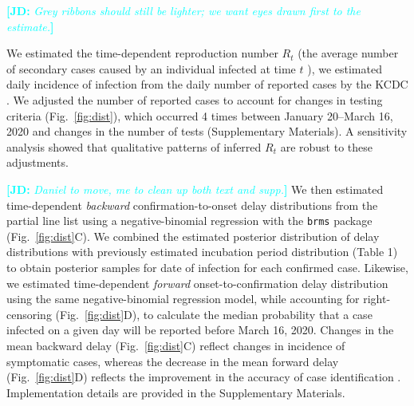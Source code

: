 \documentclass[12pt]{article}
\newcommand{\comment}{\showcomment}
\newcommand{\showcomment}[3]{\textcolor{#1}{\textbf{[#2: }\textsl{#3}\textbf{]}}}
\newcommand{\jd}[1]{\comment{cyan}{JD}{#1}}
\newcommand{\fref}[1]{Fig.~\ref{fig:#1}}
\begin{document}
\jd{Grey ribbons should still be lighter; we want eyes drawn first to the estimate.}

We estimated the time-dependent reproduction number $R_t$ (the average number of secondary cases caused by an individual infected at time $t$ \citep{fraser2007estimating}), we estimated daily incidence of infection  from the daily number of reported cases by the KCDC \citep{kcdc}.
We adjusted the number of reported cases to account for changes in testing criteria (\fref{dist}), which occurred 4 times between January 20--March 16, 2020 and changes in the number of tests (Supplementary Materials).
A sensitivity analysis showed that qualitative patterns of inferred $R_t$ are robust to these adjustments.

\jd{Daniel to move, me to clean up both text and supp.}
We then estimated time-dependent \emph{backward} confirmation-to-onset delay distributions from the partial line list using a negative-binomial regression with the \texttt{brms} package \citep{burkner2017brms} (\fref{dist}C).
We combined the estimated posterior distribution of delay distributions with previously estimated incubation period distribution (Table 1) to obtain posterior samples for date of infection for each confirmed case.
Likewise, we estimated time-dependent \emph{forward} onset-to-confirmation delay distribution using the same negative-binomial regression model, while accounting for right-censoring (\fref{dist}D),
to calculate the median probability that a case infected on a given day will be reported before March 16, 2020.
Changes in the mean backward delay (\fref{dist}C) reflect changes in incidence of symptomatic cases, whereas the decrease in the mean forward delay (\fref{dist}D) reflects the improvement in the accuracy of case identification \citep{lai2020effect}.
Implementation details are provided in the Supplementary Materials.
\end{document}
